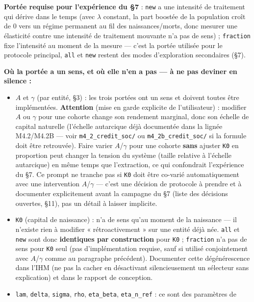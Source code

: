 \documentclass[11pt,a4paper]{article}
\newcommand{\code}[1]{\texttt{#1}}
\begin{document}
\begin{itemize}
  \textbf{Portée requise pour l'expérience du \S7} : \code{new} a une
  intensité de traitement qui dérive dans le temps (avec $\lambda$
  constant, la part boostée de la population croît de 0 vers un régime
  permanent au fil des naissances/morts, donc mesurer une élasticité
  contre une intensité de traitement mouvante n'a pas de sens) ;
  \code{fraction} fixe l'intensité au moment de la mesure --- c'est la
  portée utilisée pour le protocole principal, \code{all} et \code{new}
  restent des modes d'exploration secondaires (\S7).
\end{itemize}

\textbf{Où la portée a un sens, et où elle n'en a pas --- à ne pas
deviner en silence :}

\begin{itemize}
\item $A$ et $\gamma$ (par entité, \S3) : les trois portées ont un sens
  et doivent toutes être implémentées. \textbf{Attention} (mise en garde
  explicite de l'utilisateur) : modifier $A$ ou $\gamma$ pour une
  cohorte change son rendement marginal, donc son échelle de capital
  naturelle (l'échelle autarcique déjà documentée dans la lignée
  M4.2/M4.2B --- voir \code{m4\_2\_credit\_soc/} ou
  \code{m4\_2b\_credit\_soc/} si la formule doit être retrouvée). Faire
  varier $A$/$\gamma$ pour une cohorte \textbf{sans} ajuster \code{K0}
  en proportion peut changer la tension du système (taille relative à
  l'échelle autarcique) en même temps que l'extraction, ce qui
  confondrait l'expérience du \S7. Ce prompt ne tranche pas si \code{K0}
  doit être co-varié automatiquement avec une intervention
  $A$/$\gamma$ --- c'est une décision de protocole à prendre et à
  documenter explicitement avant la campagne du \S7 (liste des
  décisions ouvertes, \S11), pas un détail à laisser implicite.
\item \code{K0} (capital de naissance) : n'a de sens qu'au moment de la
  naissance --- il n'existe rien à modifier « rétroactivement » sur une
  entité déjà née. \code{all} et \code{new} sont donc \textbf{identiques
  par construction} pour \code{K0} ; \code{fraction} n'a pas de sens pour
  \code{K0} seul (pas d'implémentation requise, sauf si utilisé
  conjointement avec $A$/$\gamma$ comme au paragraphe précédent).
  Documenter cette dégénérescence dans l'IHM (ne pas la cacher en
  désactivant silencieusement un sélecteur sans explication) et dans le
  rapport de conception.
\item \code{lam}, \code{delta}, \code{sigma}, \code{rho},
  \code{eta\_beta}, \code{eta\_n\_ref} : ce sont des paramètres de

\end{itemize}
\end{document}
